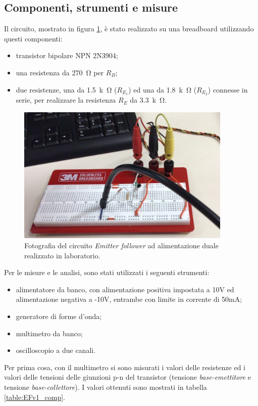 \documentclass{report}
\begin{document}
\subsection{Componenti, strumenti e misure} 
Il circuito, mostrato in figura \ref{figura:fotoEFv1}, è stato realizzato su una breadboard utilizzando questi componenti:
\begin{itemize}
\item transistor bipolare NPN 2N3904;
\item una resistenza da \SI{270}{\ohm} per $R_B$;
\item due resistenze, una da \SI{1.5}{k\ohm} ($R_{E_1}$) ed una da \SI{1.8}{k\ohm} ($R_{E_2}$) connesse in serie, per realizzare la resistenza $R_E$ da \SI{3.3}{k\ohm}.
\end{itemize}
\begin{figure}[h]
\centering
\includegraphics[height=6.6cm]{immagini/fotoEFv1}
\caption{Fotografia del circuito \textit{Emitter follower} ad alimentazione duale realizzato in laboratorio.}
\label{figura:fotoEFv1}
\end{figure}
Per le misure e le analisi, sono stati utilizzati i seguenti strumenti:
\begin{itemize}
\item alimentatore da banco, con alimentazione positiva impostata a 10V ed alimentazione negativa a -10V, entrambe con limite in corrente di 50mA;
\item generatore di forme d'onda;
\item multimetro da banco;
\item oscilloscopio a due canali.
\end{itemize}
Per prima cosa, con il multimetro si sono misurati i valori delle resistenze ed i valori delle tensioni delle giunzioni p-n del transistor (tensione \textit{base-emettitore} e tensione \textit{base-collettore}). I valori ottenuti sono mostrati in tabella \ref{table:EFv1_comp}.
\end{document}
